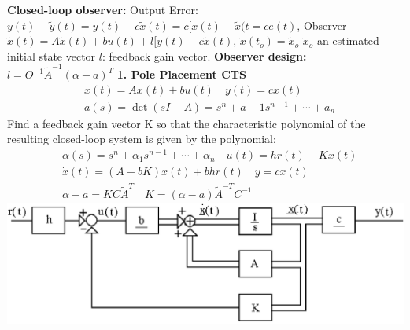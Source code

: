 \textbf{Closed-loop observer:}
Output Error: $y(t)-\tilde{y}(t)=y(t)-c\tilde{x}(t)=c[x(t)-\tilde{x}(t=ce(t)$, Observer $\tilde{x}(t)=A \tilde{x}(t)+bu(t)+l[y(t)-c\tilde{x}(t)$, $\tilde{x}(t_o)=\tilde{x}_o$ $\tilde{x}_o$ an estimated initial state vector $l$: feedback gain vector.
\textbf{Observer design:}
$l=O^{-1}\tilde{A}^{-1}(\alpha-a)^T$ \hfill \break 
\textbf{1. Pole Placement CTS}
\setlength{\abovedisplayskip}{0pt}
\setlength{\belowdisplayskip}{0pt}
\setlength{\abovedisplayshortskip}{0pt}
\setlength{\belowdisplayshortskip}{0pt}
\begin{align*}
& \dot{x}(t)=Ax(t)+bu(t) \quad y(t)=cx(t) \\
& a(s) = \det(sI-A)=s^n+a-1s^{n-1}+ \cdots + a_n
\end{align*}
 \noindent Find a feedback gain vector K so that the characteristic polynomial of the resulting closed-loop system is given by the polynomial:
\begin{align*}
& \alpha(s) =s^n+\alpha_1s^{n-1}+ \cdots + \alpha_n \quad u(t) =hr(t)- Kx(t) \\
& \dot{x}(t) = (A-bK)x(t)+b h r(t) \quad y=cx(t) \\
& \alpha - a = K C \tilde{A}^T \quad K =(\alpha -a)\tilde{A}^{-T} C^{-1}
\end{align*}
 \vspace*{-0.2cm}
\includegraphics[width=\linewidth]{poleplacementPic.png}
